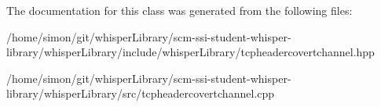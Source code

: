 \-The documentation for this class was generated from the following files\-:\begin{DoxyCompactItemize}
\item 
/home/simon/git/whisper\-Library/scm-\/ssi-\/student-\/whisper-\/library/whisper\-Library/include/whisper\-Library/tcpheadercovertchannel.\-hpp\item 
/home/simon/git/whisper\-Library/scm-\/ssi-\/student-\/whisper-\/library/whisper\-Library/src/tcpheadercovertchannel.\-cpp\end{DoxyCompactItemize}
